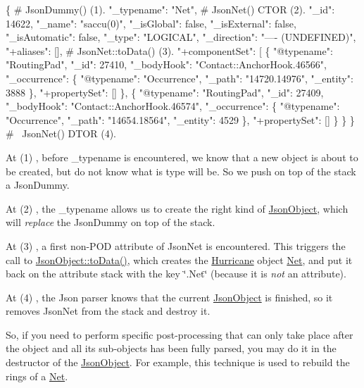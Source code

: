 \begin{DoxyCode}
\{                          # JsonDummy()  (1).
  "\_typename": "Net",      # JsonNet()  CTOR (2).
  "\_id": 14622,
  "\_name": "saccu(0)",
  "\_isGlobal": false,
  "\_isExternal": false,
  "\_isAutomatic": false,
  "\_type": "LOGICAL",
  "\_direction": "---- (UNDEFINED)",
  "+aliases": [],          # JsonNet::toData()  (3).
  "+componentSet": [
    \{
      "@typename": "RoutingPad",
      "\_id": 27410,
      "\_bodyHook": "Contact::AnchorHook.46566",
      "\_occurrence": \{
        "@typename": "Occurrence",
        "\_path": "14720.14976",
        "\_entity": 3888
      \},
      "+propertySet": []
    \},
    \{
      "@typename": "RoutingPad",
      "\_id": 27409,
      "\_bodyHook": "Contact::AnchorHook.46574",
      "\_occurrence": \{
        "@typename": "Occurrence",
        "\_path": "14654.18564",
        "\_entity": 4529
      \},
      "+propertySet": []
    \}
  \}
\}                          # ~JsonNet()  DTOR (4). 
\end{DoxyCode}


At {\ttfamily }(1) , before {\ttfamily \+\_\+typename} is encountered, we know that a new object is about to be created, but do not know what is type will be. So we push on top of the stack a {\ttfamily Json\+Dummy}.

At {\ttfamily }(2) , the {\ttfamily \+\_\+typename} allows us to create the right kind of \mbox{\hyperlink{classHurricane_1_1JsonObject}{Json\+Object}}, which will {\itshape replace} the {\ttfamily Json\+Dummy} on top of the stack.

At {\ttfamily }(3) , a first non-\/\+P\+OD attribute of Json\+Net is encountered. This triggers the call to {\ttfamily \mbox{\hyperlink{classHurricane_1_1JsonObject_a57a845ca64ac8912b35c4dbf75723af6}{Json\+Object\+::to\+Data()}}}, which creates the \mbox{\hyperlink{namespaceHurricane}{Hurricane}} object \mbox{\hyperlink{classHurricane_1_1Net}{Net}}, and put it back on the attribute stack with the key {\ttfamily \char`\"{}.\+Net\char`\"{}} (because it is {\itshape not} an attribute).

At {\ttfamily }(4) , the Json parser knows that the current \mbox{\hyperlink{classHurricane_1_1JsonObject}{Json\+Object}} is finished, so it removes Json\+Net from the stack and destroy it.

So, if you need to perform specific post-\/processing that can only take place {\ttfamily after} the object and all it\textquotesingle{}s sub-\/objects has been fully parsed, you may do it in the destructor of the \mbox{\hyperlink{classHurricane_1_1JsonObject}{Json\+Object}}. For example, this technique is used to rebuild the rings of a \mbox{\hyperlink{classHurricane_1_1Net}{Net}}. 